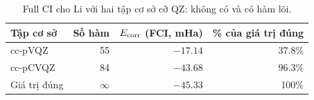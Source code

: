 \begin{table}[h]
\centering\small
\caption{Full CI cho Li với hai tập cơ sở cỡ QZ: không có và có hàm lõi.}
\label{tab:loi}
\begin{tabular}{@{}lrrr@{}}
\toprule
Tập cơ sở & Số hàm & $E_{\mathrm{corr}}$ (FCI, mHa) & \% của giá trị đúng \\
\midrule
cc-pVQZ & 55 & $-17.14$ & 37.8\% \\
cc-pCVQZ & 84 & $-43.68$ & 96.3\% \\
\midrule
Giá trị đúng & $\infty$ & $-45.33$ & 100\% \\
\bottomrule
\end{tabular}
\end{table}
